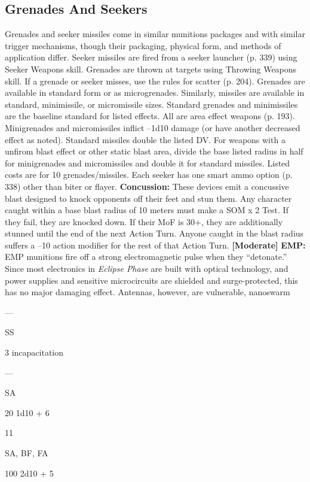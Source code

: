 \subsection{Grenades And Seekers}

Grenades and seeker missiles come in similar munitions
packages and with similar trigger mechanisms,
though their packaging, physical form, and methods 
of application differ. Seeker missiles are fired from a 
seeker launcher (p. 339) using Seeker Weapons skill. 
Grenades are thrown at targets using Throwing Weapons
skill. If a grenade or seeker misses, use the rules
for scatter (p. 204).
Grenades are available in standard form or as 
microgrenades. Similarly, missiles are available in 
standard, minimissile, or micromissile sizes. Standard 
grenades and minimissiles are the baseline standard 
for listed effects. All are area effect weapons (p. 193). 
Minigrenades and micromissiles inflict –1d10 damage 
(or have another decreased effect as noted). Standard 
missiles double the listed DV. For weapons with a 
unfirom blast effect or other static blast area, divide 
the base listed radius in half for minigrenades and micromissiles
and double it for standard missiles. Listed
costs are for 10 grenades/missiles.
Each seeker has one smart ammo option (p. 338) 
other than biter or flayer.
\textbf{Concussion:} These devices emit a concussive blast 
designed to knock opponents off their feet and stun 
them. Any character caught within a base blast radius 
of 10 meters must make a SOM x 2 Test. If they fail, 
they are knocked down. If their MoF is 30+, they are 
additionally stunned until the end of the next Action 
Turn. Anyone caught in the blast radius suffers a 
–10 action modifier for the rest of that Action Turn. 
\textbf{[Moderate]}
\textbf{EMP:} EMP munitions fire off a strong electromagnetic
pulse when they ``detonate.'' Since most electronics
in \textit{Eclipse Phase} are built with optical technology,
and power supplies and sensitive microcircuits are 
shielded and surge-protected, this has no major 
damaging effect. Antennas, however, are vulnerable, 
nanoswarm

—

SS

3
incapacitation

—

SA

20
1d10 + 6

11

SA, BF, FA

100
2d10 + 5

